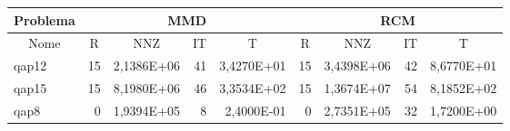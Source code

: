 \begin{tabular}{|l|r|r|r|r|r|r|r|r|}
\hline
\multicolumn{1}{|c|}{Problema} & \multicolumn{4}{|c|}{MMD} &         \multicolumn{4}{|c|}{RCM} \\ \hline
\multicolumn{1}{|c|}{Nome} & \multicolumn{1}{|c|}{R} &
        \multicolumn{1}{|c|}{NNZ} & \multicolumn{1}{|c|}{IT} &
        \multicolumn{1}{|c|}{T} & \multicolumn{1}{|c|}{R} &
        \multicolumn{1}{|c|}{NNZ} & \multicolumn{1}{|c|}{IT} &
        \multicolumn{1}{|c|}{T} \\ \hline
qap12 & 15 & 2,1386E+06 & 41 & 3,4270E+01 & 15 & 3,4398E+06 & 42 & 8,6770E+01 \\ \hline
qap15 & 15 & 8,1980E+06 & 46 & 3,3534E+02 & 15 & 1,3674E+07 & 54 & 8,1852E+02 \\ \hline
qap8 & 0 & 1,9394E+05 & 8 & 2,4000E-01 & 0 & 2,7351E+05 & 32 & 1,7200E+00 \\ \hline
\end{tabular}
